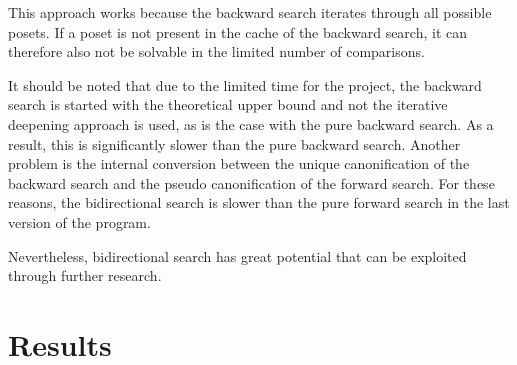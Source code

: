 \documentclass[twoside,leqno,twocolumn]{article}
\begin{document}
This approach works because the backward search iterates through all possible posets.
If a poset is not present in the cache of the backward search, it can therefore also not be solvable in the limited number of comparisons.

It should be noted that due to the limited time for the project, the backward search is started with the theoretical upper bound and not the iterative deepening approach is used, as is the case with the pure backward search.
As a result, this is significantly slower than the pure backward search.
Another problem is the internal conversion between the unique canonification of the backward search and the pseudo canonification of the forward search.
For these reasons, the bidirectional search is slower than the pure forward search in the last version of the program.

Nevertheless, bidirectional search has great potential that can be exploited through further research.



\section{Results}

\end{document}
